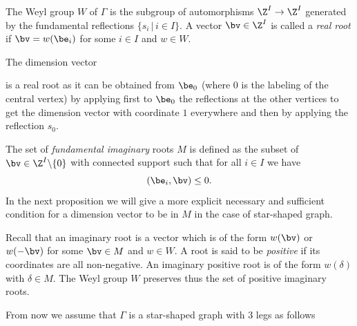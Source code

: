 The Weyl group $W$ of $\Gamma$ is the subgroup of automorphisms $\Z^I\rightarrow\Z^I$ generated by the fundamental reflections $\{s_i\,|\, i\in I\}$. A vector $\bv\in\Z^I$ is called a \emph{real root} if $\bv=w(\be_i)$ for some $i\in I$ and $w\in W$.



\begin{exam}The dimension vector 
	{\footnotesize{
			\begin{center}
	\end{center}}}
	\noindent is a real root as it can be obtained from  $\be_0$ (where $0$ is the labeling of the central vertex) by applying first to $\be_0$ the reflections at the other vertices to get the dimension vector with coordinate $1$ everywhere and then by applying the reflection $s_0$.
	
\end{exam}





The set of \emph{fundamental imaginary} roots $M$ is defined as the subset of $\bv\in\Z^I\backslash\{0\}$ with connected support such that for all $i\in I$ we have
$$
(\be_i,\bv)\leq 0.
$$
In the next proposition we will give a more explicit necessary and sufficient condition for a dimension vector to be in $M$ in the case of star-shaped graph.



Recall that an imaginary root is a vector which is of the form $w(\bv)$ or $w(-\bv)$ for some $\bv\in M$ and $w\in W$. A root is said to be \emph{positive} if its coordinates are all non-negative. An imaginary positive root is of the form $w(\delta)$ with $\delta\in M$. The Weyl group $W$ preserves thus the set of positive imaginary roots.


From now we assume that $\Gamma$ is a star-shaped graph with $3$ legs as follows 



